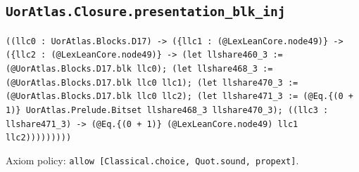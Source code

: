 \documentclass[11pt]{article}
\begin{document}
\subsection*{\texttt{UorAtlas.Closure.presentation\_blk\_inj}}
\noindent\texttt{((llc0 : UorAtlas.Blocks.D17) -> (\{llc1 : (@LexLeanCore.node49)\} -> (\{llc2 : (@LexLeanCore.node49)\} -> (let llshare460\_3 := (@UorAtlas.Blocks.D17.blk llc0); (let llshare468\_3 := (@UorAtlas.Blocks.D17.blk llc0 llc1); (let llshare470\_3 := (@UorAtlas.Blocks.D17.blk llc0 llc2); (let llshare471\_3 := (@Eq.\{(0 + 1)\} UorAtlas.Prelude.Bitset llshare468\_3 llshare470\_3); ((llc3 : llshare471\_3) -> (@Eq.\{(0 + 1)\} (@LexLeanCore.node49) llc1 llc2)))))))))}\par
\noindent Axiom policy: \texttt{allow [Classical.choice, Quot.sound, propext]}.\par
\end{document}
